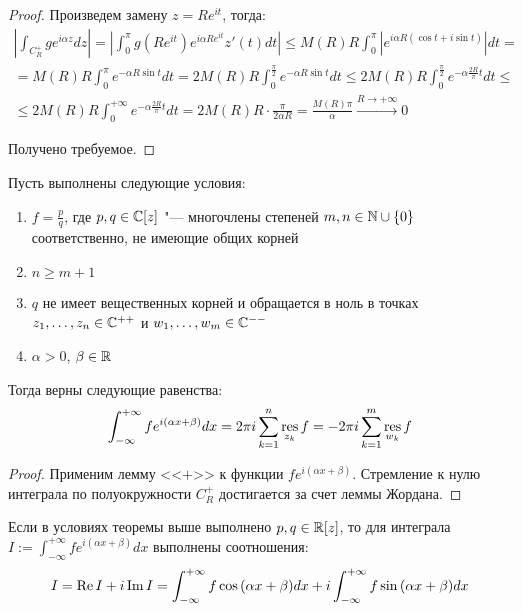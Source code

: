 \begin{proof}
	Произведем замену $z = Re^{it}$, тогда:
	\begin{multline*}
		\left|\int_{C_R^+}ge^{i\alpha z}dz\right| = \left|\int_0^\pi g(Re^{it})e^{i\alpha Re^{it}}z'(t)dt\right| \le M(R)R \int_0^\pi \left|e^{i\alpha R(\cos{t} + i\sin{t})}\right|dt = \\
		= M(R)R \int_0^\pi e^{-\alpha R\sin{t}}dt = 2M(R)R \int_0^{\frac\pi 2} e^{-\alpha R\sin{t}}dt  \le 2M(R)R \int_0^{\frac\pi 2} e^{-\alpha \frac{2R}\pi t}dt \le \\
		\le 2M(R)R \int_0^{+\infty} e^{-\alpha \frac{2R}\pi t}dt = 2M(R)R \cdot \frac\pi{2\alpha R} = \frac{M(R)\pi}{\alpha} \xrightarrow{R \to +\infty} 0
	\end{multline*}
	
	Получено требуемое.
\end{proof}

\begin{theorem}
	Пусть выполнены следующие условия:
	\begin{enumerate}
		\item $f = \frac pq$, где $p, q \in \mathbb{C}[z]$ "--- многочлены степеней $m, n \in \mathbb{N} \cup \{0\}$ соответственно, не имеющие общих корней
		\item $n \ge m + 1$
		\item $q$ не имеет вещественных корней и обращается в ноль в точках $z_1, \dotsc, z_n \in \mathbb{C}^{++}$ и $w_1, \dotsc, w_m \in \mathbb{C}^{--}$
		\item $\alpha > 0$, $\beta \in \mathbb{R}$
	\end{enumerate}
	
	Тогда верны следующие равенства:
	\[\int_{-\infty}^{+\infty}fe^{i(\alpha x + \beta)}dx = 2\pi i\sum_{k=1}^n \operatorname*{res}_{z_k}f = -2\pi i\sum_{k=1}^m \operatorname*{res}_{w_k}f\]
\end{theorem}

\begin{proof}
	Применим лемму <<$+$>> к функции $fe^{i(\alpha x + \beta)}$. Стремление к нулю интеграла по полуокружности $C_R^+$ достигается за счет леммы Жордана.
\end{proof}

\begin{note}
	Если в условиях теоремы выше выполнено $p, q \in \mathbb{R}[z]$, то для интеграла $I := \int_{-\infty}^{+\infty}fe^{i(\alpha x + \beta)}dx$ выполнены соотношения:
	\[I = \operatorname{Re} I + i \operatorname{Im} I = \int_{-\infty}^{+\infty}f\cos{(\alpha x + \beta)}dx + i\int_{-\infty}^{+\infty}f\sin{(\alpha x + \beta)}dx\]
\end{note}

